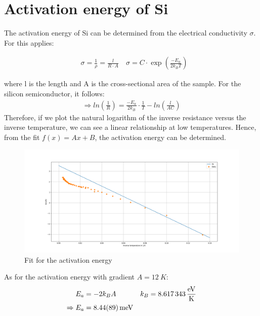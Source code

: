 
\section{Activation energy of Si}
The activation energy of Si can be determined from the electrical conductivity $\sigma$. For this applies:

\begin{align}
    &\sigma = \frac{1}{\rho} = \frac{l}{R\cdot A} \
    &\sigma = C\cdot \exp \left (\frac{-E_a}{2k_BT} \right ) 
\end{align}

where l is the length and A is the cross-sectional area of the sample. For the silicon semiconductor, it follows:
\begin{align}
    \Rightarrow ln\left( \frac{1}{R}\right ) = \frac{-E_a}{2k_B} \cdot \frac{1}{T} -ln \left ( \frac{l}{AC} \right )
\end{align}
Therefore, if we plot the natural logarithm of the inverse resistance versus the inverse temperature, we can see a linear relationship at low temperatures. Hence, from the fit $f(x) = Ax+B $, the activation energy can be determined. 
\begin{figure}
    \centering
    \includegraphics[width=1.0\textwidth]{./fig/ex4.png}
    \caption{Fit for the activation energy}
    \label{fig:E_activation}
\end{figure}
As for the activation energy with gradient $A = \SI{12}{K}$:
\begin{align}
    E_a &= -2k_BA &k_B = \SI{8,617343}{\frac{eV}{K}} \\
    \Rightarrow E_a &= \SI{8,44\pm 0,89}{meV}
\end{align}